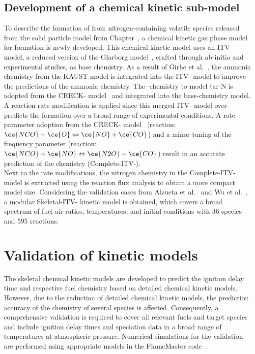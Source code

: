 \begin{refsection}
\subsection{Development of a  chemical kinetic sub-model}
To describe the formation of  from nitrogen-containing volatile species released from the solid particle model from Chapter~, a chemical kinetic gas phase model for  formation is newly developed. This chemical kinetic model uses an ITV- model, a reduced version of the Glarborg model~\cite{Glarborg2018}, crafted through ab-initio and experimental studies, as base chemistry. As a result of Girhe et al.~\cite{Girhe2024}, the ammonia chemistry from the KAUST model is integrated into the ITV- model to improve the predictions of the ammonia chemistry. The -chemistry to model tar-N is adopted from the CRECK- model~\cite{Shamooni2021} and integrated into the base-chemistry model.
\\
A reaction rate modification is applied since this merged ITV- model over-predicts the  formation over a broad range of experimental conditions. A rate parameter adoption from the CRECK- model~\cite{Shamooni2021} (reaction: $\ce{NCO}+\ce{O} \Leftrightarrow \ce{NO}+\ce{CO}$) and a minor tuning of the frequency parameter (reaction: $\ce{NCO}+\ce{NO} \Leftrightarrow \ce{N2O}+\ce{CO}$) result in an accurate prediction of the  chemistry (Complete-ITV-).
\\
Next to the rate modifications, the nitrogen chemistry in the Complete-ITV- model is extracted using the reaction flux analysis to obtain a more compact model size. Considering the validation cases from Alzueta et al.~\cite{Alzueta2002} and Wu et al.~\cite{Wu2019, Wu2022}, a modular Skeletal-ITV- kinetic model is obtained, which covers a broad spectrum of fuel-air ratios, temperatures, and initial conditions with 36 species and 595 reactions.




\newpage
\section{Validation of kinetic models}
The skeletal chemical kinetic models are developed to predict the ignition delay time and respective fuel chemistry based on detailed chemical kinetic models. However, due to the reduction of detailed chemical kinetic models, the prediction accuracy of the chemistry of several species is affected. Consequently, a comprehensive validation is required to cover all relevant fuels and target species and include ignition delay times and speciation data in a broad range of temperatures at atmospheric pressure. Numerical simulations for the validation are performed using appropriate models in the FlameMaster code~\cite{Pitsch1990}.



\end{refsection}
